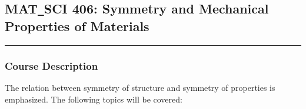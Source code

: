 	\subsection{MAT\texttt{\_}SCI 406: Symmetry and Mechanical Properties of Materials}
	\vspace{-1em} \hfill \rule{0.4\textwidth}{.4pt}\newline
	\null \hfill {} \newline
	\null \hfill {}
\normalfont
		\subsubsection*{Course Description}
The relation between symmetry of structure and symmetry of properties is emphasized. The following topics will be covered:

